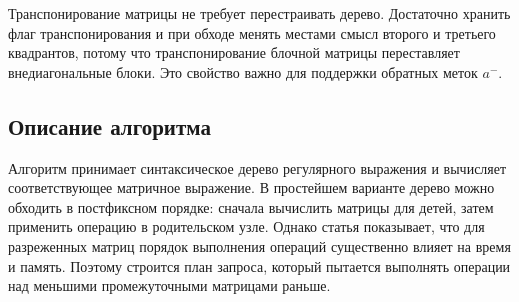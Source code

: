 Транспонирование матрицы не требует перестраивать дерево. Достаточно хранить флаг транспонирования и при обходе менять местами смысл второго и третьего квадрантов, потому что транспонирование блочной матрицы переставляет внедиагональные блоки. Это свойство важно для поддержки обратных меток $a^{-}$.

\subsection{Описание алгоритма}
\label{subsec:RPQ_Arroyuelo_algorithm}

Алгоритм принимает синтаксическое дерево регулярного выражения и вычисляет соответствующее матричное выражение. В простейшем варианте дерево можно обходить в постфиксном порядке: сначала вычислить матрицы для детей, затем применить операцию в родительском узле. Однако статья показывает, что для разреженных матриц порядок выполнения операций существенно влияет на время и память. Поэтому строится план запроса, который пытается выполнять операции над меньшими промежуточными матрицами раньше.

\begin{algorithm}[H]
    \footnotesize
    \caption{Вычисление 2-RPQ через сжатые булевы матрицы}
    \label{lst:RPQ_Arroyuelo_eval}
\end{algorithm}

